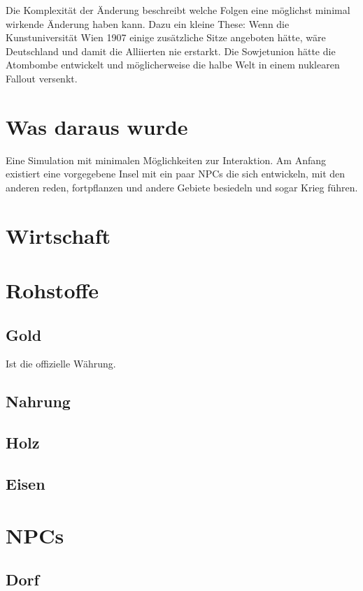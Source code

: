 \documentclass[11pt]{article}
\begin{document}
Die Komplexität der Änderung beschreibt welche Folgen eine möglichst minimal wirkende Änderung haben kann. Dazu ein kleine These: Wenn die Kunstuniversität Wien 1907 einige zusätzliche Sitze angeboten hätte, wäre Deutschland und damit die Alliierten nie erstarkt. Die Sowjetunion hätte die Atombombe entwickelt und möglicherweise die halbe Welt in einem nuklearen Fallout versenkt. 

\section{Was daraus wurde}
Eine Simulation mit minimalen Möglichkeiten zur Interaktion. Am Anfang existiert eine vorgegebene Insel mit ein paar NPCs die sich entwickeln, mit den anderen reden, fortpflanzen und andere Gebiete besiedeln und sogar Krieg führen. 

   



\section{Wirtschaft}




\section{Rohstoffe}
\subsection{Gold}
Ist die offizielle Währung. 

\subsection{Nahrung}


\subsection{Holz}

\subsection{Eisen}

\section{NPCs}
\subsection{Dorf}
\end{document}
